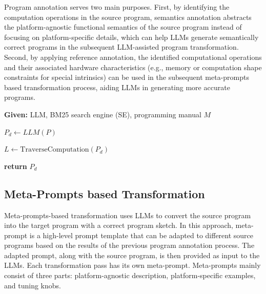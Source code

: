 Program annotation serves two main purposes. First, by identifying the computation operations in the source program, semantics annotation abstracts the platform-agnostic functional semantics of the source program instead of focusing on platform-specific details, which can help LLMs generate semantically correct programs in the subsequent LLM-assisted program transformation. 
Second, by applying reference annotation, the identified computational operations and their associated hardware characteristics (e.g., memory or computation shape constraints for special intrinsics) can be used in the subsequent meta-prompts based transformation process, aiding LLMs in generating more accurate programs.
\vspace{-10pt}

\begin{algorithm}[!h]
\scriptsize
\SetAlgoLined
{}
\textbf{Given:} LLM, BM25 search engine (SE), programming manual $M$


$P_{d} \gets LLM(P) $


$L \gets \text{TraverseComputation}(P_{d})$

\textbf{return} $P_{d}$
\caption{Program Annotation Algorithm}
\label{alg:code_annotation}
\end{algorithm}

\vspace{-20pt}
\subsection{Meta-Prompts based Transformation}
Meta-prompts-based transformation uses LLMs to convert the source program into the target program with a correct program sketch. 
In this approach, meta-prompt is a high-level prompt template that can be adapted to different source programs based on the results of the previous program annotation process. The adapted prompt, along with the source program, is then provided as input to the LLMs. 
Each transformation pass has its own meta-prompt. Meta-prompts mainly consist of three parts: platform-agnostic description, platform-specific examples, and tuning knobs.


